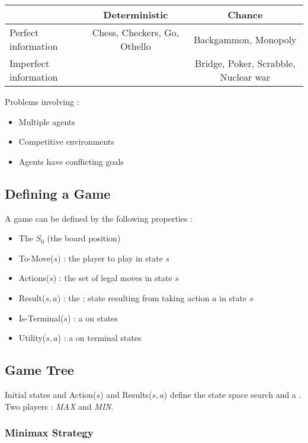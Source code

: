 \begin{center}
\begin{tabular}{l|c|c}
 & Deterministic & Chance \\ 
\hline 
Perfect information & Chess, Checkers, Go, Othello & Backgammon, Monopoly \\ 
\hline 
Imperfect information &  & Bridge, Poker, Scrabble, Nuclear war \\ 
\end{tabular} 
\end{center}

Problems involving :
\begin{itemize}
\item Multiple agents
\item Competitive environments
\item Agents have conflicting goals
\end{itemize}

\subsection{Defining a Game}

A game can be defined by the following properties :
\begin{itemize}
\item The  $S_0$ (the board position)
\item To-Move($s$) : the player to play in state $s$
\item Actions($s$) : the set of legal moves in state $s$
\item Result($s, a$) : the ; state resulting from taking action $a$ in state $s$
\item Is-Terminal($s$) : a  on states
\item Utility($s, a$) : a  on terminal states
\end{itemize}

\newpage
\subsection{Game Tree}

Initial states and Action($s$) and Results($s,a$) define the state space search and a .\\
Two players : \textit{MAX} and \textit{MIN}.

\subsubsection{Minimax Strategy}

